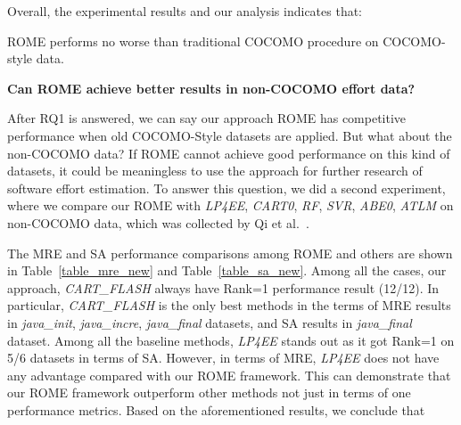 Overall, the experimental results and our analysis indicates that:
 
 \begin{result}{1}
ROME performs no worse than traditional COCOMO procedure on COCOMO-style data.
 \end{result}

{\bf Can ROME achieve better results in non-COCOMO effort data?}

After RQ1 is answered, we can say our approach ROME has competitive performance when old COCOMO-Style datasets are applied. But what about the non-COCOMO data? If ROME cannot achieve good performance on this kind of datasets, it could be meaningless to use the approach for further research of software effort estimation. To answer this question, we did a second experiment, where we compare our ROME with {\it LP4EE}, {\it CART0}, {\it RF}, {\it SVR}, {\it ABE0}, {\it ATLM} on non-COCOMO data, which was collected by Qi et al.~\cite{qi2017software}.



The MRE and SA performance comparisons among ROME and others are shown in  Table~\ref{table_mre_new} and Table~\ref{table_sa_new}. Among all the cases, our approach, {\it CART\_FLASH} always have Rank=1 performance result (12/12). In particular, {\it CART\_FLASH} is the only best methods in the terms of MRE results in {\it java\_init}, {\it java\_incre}, {\it java\_final} datasets, and SA results in {\it java\_final} dataset. Among all the baseline methods, {\it LP4EE} stands out as it got Rank=1 on 5/6 datasets in terms of SA. However, in terms of MRE, {\it LP4EE} does not have any advantage compared with our ROME framework. This can demonstrate that our ROME framework outperform other methods not just in terms of one performance metrics. 
Based on the aforementioned results, we conclude that

